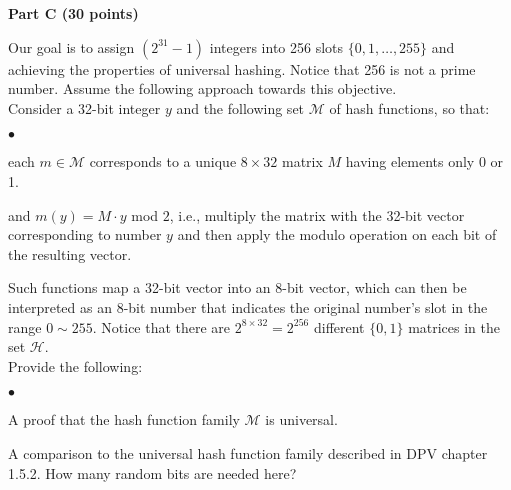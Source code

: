 \documentclass{article}
\newenvironment{myitem}{\begin{list}{$\bullet$}
{\setlength{\itemsep}{-0pt}
\setlength{\topsep}{0pt}
\setlength{\labelwidth}{0pt}
\setlength{\leftmargin}{10pt}
\setlength{\parsep}{-0pt}
\setlength{\itemsep}{0pt}
\setlength{\partopsep}{0pt}}}%
{\end{list}}
\begin{document}
\begin{center}
{\bf Part C (30 points)}
\end{center}

 Our goal is to assign $(2^{31}-1)$ integers
into 256 slots $\{0,1, \dots, 255\}$ and achieving the properties of
universal hashing. Notice that 256 is not a prime number. Assume the
following approach towards this objective.\\

\noindent Consider a 32-bit integer $y$ and the following set $\mathcal{M}$ of
hash functions, so that:
\begin{myitem}
\item each $m \in \mathcal{M}$ corresponds to a unique $8 \times 32$
  matrix $M$ having elements only 0 or 1.
\item and $m(y) = M \cdot y$ mod $2$, i.e., multiply the matrix with
  the 32-bit vector corresponding to number $y$ and then apply the
  modulo operation on each bit of the resulting vector.\\
\end{myitem}

\noindent Such functions map a 32-bit vector into an 8-bit vector,
which can then be interpreted as an 8-bit number that indicates the
original number's slot in the range $0 \sim 255$. Notice that there
are $2^{8\times32}=2^{256}$ different $\{0,1\}$ matrices in the set
$\mathcal{H}$.\\

\noindent Provide the following:
\begin{myitem}
\item A proof that the hash function family $\mathcal{M}$ is
  universal.

\item A comparison to the universal hash function family described in
  DPV chapter 1.5.2. How many random bits are needed here?\\
\end{myitem}

\newpage
\end{document}
